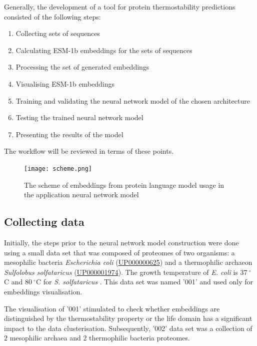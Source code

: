 \documentclass[12pt]{article}
\begin{document}
	Generally, the development of a tool for protein thermostability predictions
	consisted of the following steps:

	\begin{enumerate}
		\item Collecting sets of sequences
		\item Calculating ESM-1b embeddings for the sets of sequences
		\item Processing the set of generated embeddings
		\item Visualising ESM-1b embeddings
		\item Training and validating the neural network model of the chosen architecture 
		\item Testing the trained neural network model
		\item Presenting the results of the model
	\end{enumerate}

	The workflow will be reviewed in terms of these points.

	\begin{figure}[h!]
		\centering
		\texttt{[image: scheme.png]}

		\caption{The scheme of embeddings from protein language model usage in the 
		application neural network model}
		\label{figure:EmbeddingsUsageScheme}
	\end{figure}

	\subsection{Collecting data}

	Initially, the steps prior to the neural network model construction 
	were done using a small data set that was composed of proteomes of two 
	organisms: a mesophilic bacteria \textit{Escherichia coli} 
	(\href{https://www.uniprot.org/proteomes/UP000000625}{UP000000625}) and a 
	thermophilic archaeon \textit{Sulfolobus solfataricus} 
	(\href{https://www.uniprot.org/proteomes/UP000001974}{UP000001974}). The 
	growth temperature of \textit{E. coli} is $37\ ^\circ$C \cite{jang2017environmental}
	and $80\ ^\circ$C for \textit{S. solfataricus} \cite{zaparty2010hot}. This 
	data set was named '001' and used only for embeddings visualisation.

	The visualisation of '001' stimulated to check whether embeddings are 
	distinguished by the thermostability property or the life domain has a
	significant impact to the data clusterisation. Subsequently, '002' data set 
	was a collection of 2 mesophilic archaea and 2 thermophilic bacteria
	proteomes.
\end{document}

